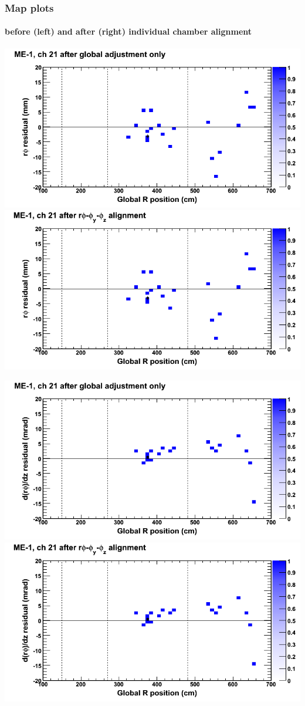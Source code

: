 \documentclass[compress]{beamer}
\begin{document}
\begin{frame}
\frametitle{Map plots}
\framesubtitle{before (left) and after (right) individual chamber alignment}
\includegraphics[width=0.5\linewidth]{ringmapplots_3dof/before_CSCvsr_mem1ch21_x.png} \includegraphics[width=0.5\linewidth]{ringmapplots_3dof/after_CSCvsr_mem1ch21_x.png}

\includegraphics[width=0.5\linewidth]{ringmapplots_3dof/before_CSCvsr_mem1ch21_dxdz.png} \includegraphics[width=0.5\linewidth]{ringmapplots_3dof/after_CSCvsr_mem1ch21_dxdz.png}
\end{frame}
\end{document}
